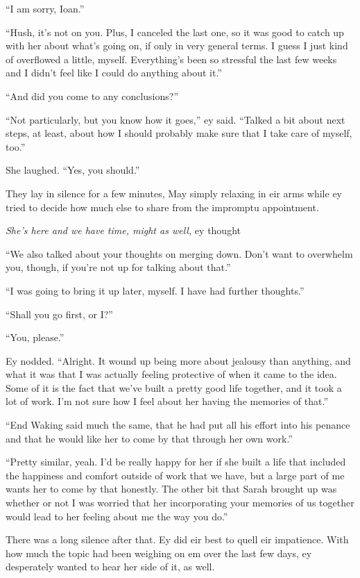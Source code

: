 ``I am sorry, Ioan.''

``Hush, it's not on you. Plus, I canceled the last one, so it was good to catch up with her about what's going on, if only in very general terms. I guess I just kind of overflowed a little, myself. Everything's been so stressful the last few weeks and I didn't feel like I could do anything about it.''

``And did you come to any conclusions?''

``Not particularly, but you know how it goes,'' ey said. ``Talked a bit about next steps, at least, about how I should probably make sure that I take care of myself, too.''

She laughed. ``Yes, you should.''

They lay in silence for a few minutes, May simply relaxing in eir arms while ey tried to decide how much else to share from the impromptu appointment.

\emph{She's here and we have time, might as well,} ey thought

``We also talked about your thoughts on merging down. Don't want to overwhelm you, though, if you're not up for talking about that.''

``I was going to bring it up later, myself. I have had further thoughts.''

``Shall you go first, or I?''

``You, please.''

Ey nodded. ``Alright. It wound up being more about jealousy than anything, and what it was that I was actually feeling protective of when it came to the idea. Some of it is the fact that we've built a pretty good life together, and it took a lot of work. I'm not sure how I feel about her having the memories of that.''

``End Waking said much the same, that he had put all his effort into his penance and that he would like her to come by that through her own work.''

``Pretty similar, yeah. I'd be really happy for her if she built a life that included the happiness and comfort outside of work that we have, but a large part of me wants her to come by that honestly. The other bit that Sarah brought up was whether or not I was worried that her incorporating your memories of us together would lead to her feeling about me the way you do.''

There was a long silence after that. Ey did eir best to quell eir impatience. With how much the topic had been weighing on em over the last few days, ey desperately wanted to hear her side of it, as well.

